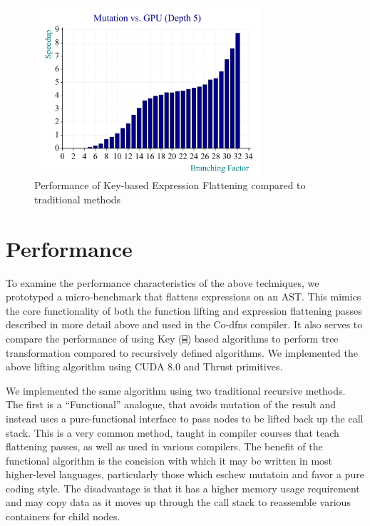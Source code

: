 ﻿\documentclass[numbers,10pt,preprint]{sigplanconf}
\begin{document}
\begin{figure}
\begin{center}
\includegraphics[width=3.3in]{mut_gpu_2d}
\end{center}
\caption{Performance of Key-based Expression Flattening compared to traditional methods}
\label{fig-bench}
\end{figure}

\section{Performance}

To examine the performance characteristics of the above techniques, we prototyped a micro-benchmark that flattens expressions on an AST. This mimics the core functionality of both the function lifting and expression flattening passes described in more detail above and used in the Co-dfns compiler. It also serves to compare the performance of using Key (\verb;⌸;) based algorithms to perform tree transformation compared to recursively defined algorithms. We implemented the above lifting algorithm using CUDA 8.0 and Thrust primitives. 

We implemented the same algorithm using two traditional recursive methods. The first is a ``Functional'' analogue, that avoids mutation of the result and instead uses a pure-functional interface to pass nodes to be lifted back up the call stack. This is a very common method, taught in compiler courses that teach flattening passes, as well as used in various compilers. The benefit of the functional algorithm is the concision with which it may be written in most higher-level languages, particularly those which eschew mutatoin and favor a pure coding style. The disadvantage is that it has a higher memory usage requirement and may copy data as it moves up through the call stack to reassemble various containers for child nodes.
\end{document}
